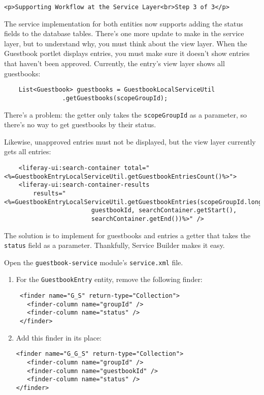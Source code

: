 \begin{verbatim}
<p>Supporting Workflow at the Service Layer<br>Step 3 of 3</p>
\end{verbatim}

The service implementation for both entities now supports adding the
status fields to the database tables. There's one more update to make in
the service layer, but to understand why, you must think about the view
layer. When the Guestbook portlet displays entries, you must make sure
it doesn't show entries that haven't been approved. Currently, the
entry's view layer shows all guestbooks:

\begin{verbatim}
    List<Guestbook> guestbooks = GuestbookLocalServiceUtil
                .getGuestbooks(scopeGroupId);
\end{verbatim}

There's a problem: the getter only takes the \texttt{scopeGroupId} as a
parameter, so there's no way to get guestbooks by their status.

Likewise, unapproved entries must not be displayed, but the view layer
currently gets all entries:

\begin{verbatim}
    <liferay-ui:search-container total="<%=GuestbookEntryLocalServiceUtil.getGuestbookEntriesCount()%>">
    <liferay-ui:search-container-results
        results="<%=GuestbookEntryLocalServiceUtil.getGuestbookEntries(scopeGroupId.longValue(),
                        guestbookId, searchContainer.getStart(),
                        searchContainer.getEnd())%>" />
\end{verbatim}

The solution is to implement for guestbooks and entries a getter that
takes the \texttt{status} field as a parameter. Thankfully, Service
Builder makes it easy.

Open the \texttt{guestbook-service} module's \texttt{service.xml} file.

\begin{enumerate}
\def\labelenumi{\arabic{enumi}.}
\item
  For the \texttt{GuestbookEntry} entity, remove the following finder:

\begin{verbatim}
 <finder name="G_S" return-type="Collection">
   <finder-column name="groupId" />
   <finder-column name="status" />
 </finder>
\end{verbatim}
\item
  Add this finder in its place:

\begin{verbatim}
<finder name="G_G_S" return-type="Collection">
   <finder-column name="groupId" />
   <finder-column name="guestbookId" />
   <finder-column name="status" />
</finder>
\end{verbatim}
\end{enumerate}

